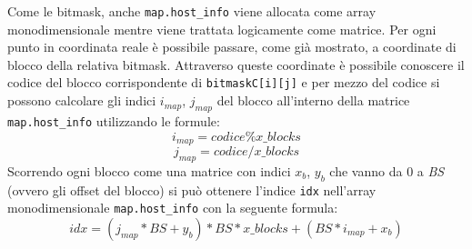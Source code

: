 				Come le bitmask, anche \texttt{map.host\_info} viene allocata come array monodimensionale mentre viene trattata logicamente come matrice. Per ogni punto in coordinata reale \`{e} possibile passare, come gi\`{a} mostrato, a coordinate di blocco della relativa bitmask. Attraverso queste coordinate \`{e} possibile conoscere il codice del blocco corrispondente di \texttt{bitmaskC[i][j]} e per mezzo del codice si possono calcolare gli indici $i_{map}$, $j_{map}$ del blocco all'interno della matrice \texttt{map.host\_info} utilizzando le formule:
				\[
					i_{map} = codice  \%  x\_blocks
				\]
				\[
					j_{map} = codice / x\_blocks
				\]
				Scorrendo ogni blocco come una matrice con indici $x_b$, $y_b$ che vanno da 0 a \textit{BS} (ovvero gli offset del blocco) si pu\`{o} ottenere l'indice \texttt{idx} nell'array monodimensionale \texttt{map.host\_info} con la seguente formula:
				\[
					idx = (j_{map}*BS+y_b)*BS*x\_blocks + (BS*i_{map}+x_{b})
				\]

